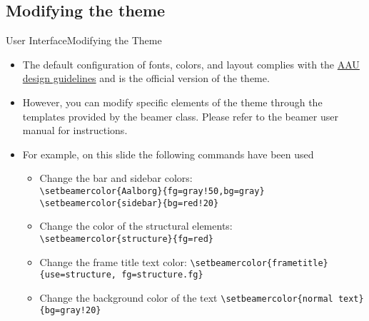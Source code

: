 \documentclass[10pt]{beamer}
\newcommand{\chref}[2]{%
  \href{#1}{{\usebeamercolor[bg]{Aalborg}#2}}%
}
\begin{document}
\subsection{Modifying the theme}
{
\begin{frame}{User Interface}{Modifying the Theme}
  \begin{itemize}
    \item<1-> The default configuration of fonts, colors, and layout complies with the \chref{http://aau.designguiden.dk}{AAU design guidelines} and is the \alert{official} version of the theme.
    \item<2-> However, you can modify specific elements of the theme through the templates provided by the beamer class. Please refer to the beamer user manual for instructions.
    \item<3-> For example, on this slide the following commands have been used
      \begin{itemize}
        \item Change the bar and sidebar colors:\\
        {\tt \textbackslash setbeamercolor\{Aalborg\}\{fg=gray!50,bg=gray\}}
        {\tt \textbackslash setbeamercolor\{sidebar\}\{bg=red!20\}}
        \item Change the color of the structural elements:\\
        {\tt \textbackslash setbeamercolor\{structure\}\{fg=red\}}\\
        \item Change the frame title text color:
        {\tt \textbackslash setbeamercolor\{frametitle\}\{use=structure, fg=structure.fg\}}
        \item Change the background color of the text
        {\tt \textbackslash setbeamercolor\{normal text\}\{bg=gray!20\}}
      \end{itemize}
  \end{itemize}
\end{frame}}
\end{document}
